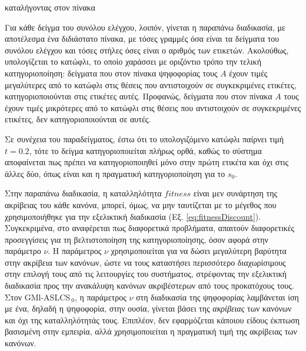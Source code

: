 καταλήγοντας στον πίνακα

\begin{center}
\end{center}

Για κάθε δείγμα του συνόλου ελέγχου, λοιπόν, γίνεται η παραπάνω διαδικασία, με αποτέλεσμα ένα διδιάστατο πίνακα, με τόσες γραμμές όσα είναι τα δείγματα του συνόλου ελέγχου και τόσες στήλες όσες είναι ο αριθμός των ετικετών. Ακολούθως, υπολογίζεται το κατώφλι, το οποίο χαράσσει με οριζόντιο τρόπο την τελική κατηγοριοποίηση: δείγματα που στον πίνακα ψηφοφορίας τους $A$ έχουν τιμές μεγαλύτερες από το κατώφλι στις θέσεις που αντιστοιχούν σε συγκεκριμένες ετικέτες, κατηγοριοποιούνται στις ετικέτες αυτές. Προφανώς, δείγματα που στον πίνακα $A$ τους έχουν τιμές μικρότερες από το κατώφλι στις θέσεις που αντιστοιχούν σε συγκεκριμένες ετικέτες, δεν κατηγοριοποιούνται σε αυτές.

Σε συνέχεια του παραδείγματος, έστω ότι το υπολογιζόμενο κατώφλι παίρνει τιμή $t = 0.2$, τότε το δείγμα κατηγοριοποιείται πλήρως ορθά, καθώς το σύστημα αποφαίνεται πως πρέπει να κατηγοριοποιηθεί μόνο στην πρώτη ετικέτα και όχι στις άλλες δύο, όπως είναι και η πραγματική κατηγοριοποίηση για το $s_{0}$.


Στην παραπάνω διαδικασία, η καταλληλότητα $fitness$ είναι μεν συνάρτηση της ακρίβειας του κάθε κανόνα, μπορεί, όμως, να μην ταυτίζεται με το μέγεθος που χρησιμοποιήθηκε για την εξελικτική διαδικασία (Εξ. \ref{eq:fitnessDiscount}). Συγκεκριμένα, στο \cite{2000697} αναφέρεται πως διαφορετικά προβλήματα, απαιτούν διαφορετικές προσεγγίσεις για τη βελτιστοποίηση της κατηγοριοποίησης, όσον αφορά στην παράμετρο $\nu$. Η παράμετρος $\nu$ χρησιμοποιείται για να δώσει μεγαλύτερη βαρύτητα στην ακρίβεια των κανόνων, ώστε να τους καταστήσει περισσότερο διαχωρίσιμους στην επιλογή τους από τις λειτουργίες του συστήματος, στρέφοντας την εξελικτική διαδικασία προς την ανακάλυψη κανόνων ακριβέστερων από τους προκατόχους τους. Στον GMl-ASLCS$_{\:0}$, η παράμετρος $\nu$ στη διαδικασία της ψηφοφορίας λαμβάνεται ίση με ένα, δηλαδή η ψηφοφορία, στην ουσία, γίνεται βάσει της \emph{ακρίβειας} των κανόνων και όχι της καταλληλότητάς τους. Επιπλέον, δεν εφαρμόζεται κάποιου είδους έκπτωση βασισμένη στην εμπειρία, αλλά χρησιμοποιείται η πραγματική τιμή της ακρίβειας των κανόνων.


